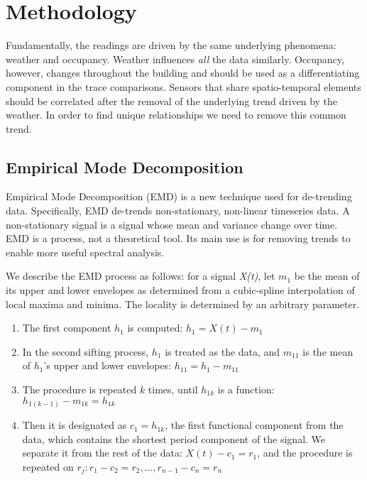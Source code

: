 


\section{Methodology}\label{method}

Fundamentally, the readings are driven by the same underlying phenomena: 
weather and occupancy.  Weather influences \emph{all} the data similarly.  Occupancy, however, changes
throughout the building and should be used as a differentiating component in the trace
comparisons.  Sensors that share spatio-temporal elements should be correlated after the removal
of the underlying trend driven by the weather.  In order to find unique relationships we need to remove 
this common trend.

\subsection{Empirical Mode Decomposition}
Empirical Mode Decomposition (EMD) \cite{huang:emd1998} is a new technique used for de-trending data.
Specifically, EMD de-trends non-stationary, non-linear timeseries data.  
A non-stationary signal is a signal whose mean and
variance change over time.  EMD is a process, not a theoretical tool.  Its main use is for removing trends 
to enable more useful spectral analysis.

We describe the EMD process as follows:  for a signal \emph{X(t)}, let $m_1$ be the mean of its upper and
lower envelopes as determined from a cubic-spline interpolation of local maxima and minima. The locality 
is determined by an arbitrary parameter.

\begin{enumerate}
\item The first component $h_1$ is computed: $h_1=X(t)-m_1$
\item In the second sifting process, $h_1$ is treated as the data, and $m_{11}$ is the mean of $h_1$'s upper and lower envelopes: $h_{11}=h_1-m_{11}$
\item The procedure is repeated $k$ times, until $h_{1k}$ is a function: $h_{1(k-1)}-m_{1k}=h_{1k}$
\item Then it is designated as $c_1=h_{1k}$, the first functional component from the data, which contains the shortest period component of the signal. We separate it from the rest of the data: $X(t)-c_1 = r_1$, and the procedure is
repeated on $r_j: r_1-c_2 = r_2,\dots,r_{n-1} - c_n = r_n$
\end{enumerate}

